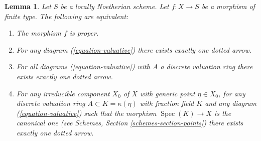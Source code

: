 \documentclass{stacks-project}
\theoremstyle{plain}
\newtheorem{lemma}[subsection]{Lemma}
\theoremstyle{definition}
\theoremstyle{remark}
\numberwithin{equation}{subsection}
\def\Spec{\mathop{\mathrm{Spec}}}
\begin{document}
\begin{lemma}
\label{lemma-Noetherian-dvr-valuative-proper}
Let $S$ be a locally Noetherian scheme.
Let $f : X \to S$ be a morphism of finite type.
The following are equivalent:
\begin{enumerate}
\item The morphism $f$ is proper.
\item For any diagram (\ref{equation-valuative}) there exists exactly
one dotted arrow.
\item For all diagrams (\ref{equation-valuative}) with $A$ a discrete
valuation ring there exists exactly one dotted arrow.
\item For any irreducible component $X_0$ of $X$ with
generic point $\eta \in X_0$, for any discrete valuation ring
$A \subset K = \kappa(\eta)$ with fraction field $K$ and any
diagram (\ref{equation-valuative}) such that
the morphism $\Spec(K) \to X$ is the canonical one
(see
Schemes, Section \ref{schemes-section-points})
there exists exactly one dotted arrow.
\end{enumerate}
\end{lemma}
\end{document}

